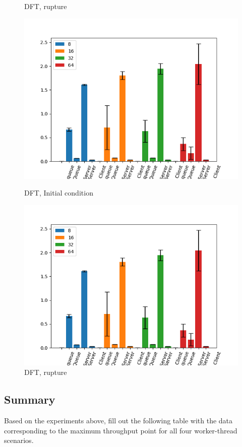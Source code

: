 \documentclass[11pt,a4paper]{article}
\begin{document}
\begin{figure}[H]
\begin{minipage}[b]{0.5\linewidth}
    \caption{DFT, rupture} 
    \vspace{4ex}
  \end{minipage} 
    \begin{minipage}[b]{0.5\linewidth}
    \centering
    \includegraphics[width=0.7\linewidth]{img/exp4_1/exp4_1_mw_percentile_plots_writes_1__vc_32.png} 
    \caption{DFT, Initial condition} 
    \vspace{4ex}
  \end{minipage}%
  \begin{minipage}[b]{0.5\linewidth}
    \centering
    \includegraphics[width=0.7\linewidth]{img/exp4_1/exp4_1_mw_percentile_plots_writes_1__vc_32.png} 
    \caption{DFT, rupture} 
    \vspace{4ex}
  \end{minipage} 
\end{figure}

\subsection{Summary}

Based on the experiments above, fill out the following table with the data corresponding to the maximum throughput point for all four worker-thread scenarios.
\end{document}
